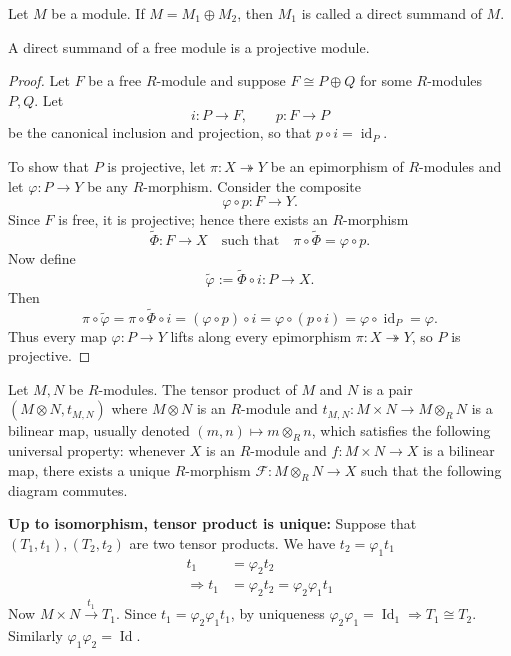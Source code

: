 \documentclass[11pt, a4paper]{report}
\begin{document}
\begin{definition}
Let $M$ be a module. If $M = M_1 \oplus M_2$, then $M_1$ is called a direct summand of $M$.
\end{definition}

\begin{proposition}
A direct summand of a free module is a projective module.
\end{proposition}

\begin{proof}
Let $F$ be a free $R$-module and suppose $F \cong P\oplus Q$ for some $R$-modules
$P,Q$. Let 
\[
i:P\to F,\qquad p:F\to P
\]
be the canonical inclusion and projection, so that $p\circ i=\operatorname{id}_P$.

To show that $P$ is projective, let $\pi:X\twoheadrightarrow Y$ be an epimorphism
of $R$-modules and let $\varphi:P\to Y$ be any $R$-morphism. Consider the composite
\[
\varphi\circ p: F\to Y.
\]
Since $F$ is free, it is projective; hence there exists an $R$-morphism
\[
\widetilde\Phi:F\to X
\quad\text{such that}\quad
\pi\circ \widetilde\Phi=\varphi\circ p.
\]
Now define
\[
\widetilde\varphi := \widetilde\Phi\circ i : P\to X.
\]
Then
\[
\pi\circ \widetilde\varphi
= \pi\circ \widetilde\Phi\circ i
= (\varphi\circ p)\circ i
= \varphi\circ (p\circ i)
= \varphi\circ \operatorname{id}_P
= \varphi.
\]
Thus every map $\varphi:P\to Y$ lifts along every epimorphism $\pi:X\twoheadrightarrow Y$,
so $P$ is projective.
\end{proof}

\begin{definition}
Let $M, N$ be $R$-modules. The tensor product of $M$ and $N$ is a pair $(M \otimes N, t_{M, N})$ where $M \otimes N$ is an $R$-module and $t_{M, N}: M \times N \rightarrow M \otimes_{R} N$ is a bilinear map, usually denoted $(m, n) \mapsto m \otimes_{R} n$, which satisfies the following universal property: whenever $X$ is an $R$-module and $f: M \times N \rightarrow X$ is a bilinear map, there exists a unique $R$-morphism $\mathcal{F}: M \otimes_{R} N \rightarrow X$ such that the following diagram commutes.
\end{definition}

\textbf{Up to isomorphism, tensor product is unique:} Suppose that $(T_{1}, t_{1}), (T_{2}, t_{2})$ are two tensor products. We have $t_{2}=\varphi_{1} t_{1}$
\[
\begin{aligned}
t_{1} & =\varphi_{2} t_{2} \\
\Rightarrow t_{1} & =\varphi_{2} t_{2}=\varphi_{2} \varphi_{1} t_{1}
\end{aligned}
\]
Now $M \times N \xrightarrow{t_{1}} T_{1}$. Since $t_{1}=\varphi_{2} \varphi_{1} t_{1}$, by uniqueness $\varphi_{2} \varphi_{1}=\operatorname{Id}_{1} \Rightarrow T_{1} \cong T_{2}$. Similarly $\varphi_{1} \varphi_{2}=\operatorname{Id}$.
\end{document}
